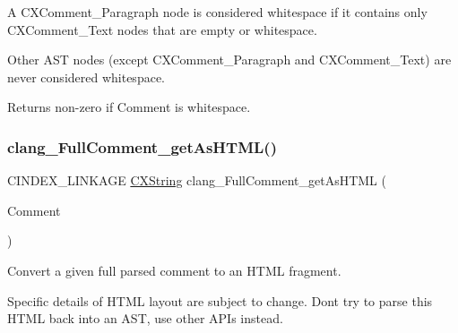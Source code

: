 A {\ttfamily C\+X\+Comment\+\_\+\+Paragraph} node is considered whitespace if it contains only {\ttfamily C\+X\+Comment\+\_\+\+Text} nodes that are empty or whitespace. 

Other A\+ST nodes (except {\ttfamily C\+X\+Comment\+\_\+\+Paragraph} and {\ttfamily C\+X\+Comment\+\_\+\+Text}) are never considered whitespace.

\begin{DoxyReturn}{Returns}
non-\/zero if {\ttfamily Comment} is whitespace. 
\end{DoxyReturn}
\mbox{\label{group__CINDEX__COMMENT_gafdfc03bbfdddd06c380a2644f16ccba9}} 
\subsubsection{\texorpdfstring{clang\+\_\+\+Full\+Comment\+\_\+get\+As\+H\+T\+M\+L()}{clang\_FullComment\_getAsHTML()}}
{\footnotesize\ttfamily C\+I\+N\+D\+E\+X\+\_\+\+L\+I\+N\+K\+A\+GE \mbox{\hyperlink{structCXString}{C\+X\+String}} clang\+\_\+\+Full\+Comment\+\_\+get\+As\+H\+T\+ML (\begin{DoxyParamCaption}\item[{\mbox{\hyperlink{structCXComment}{C\+X\+Comment}}}]{Comment }\end{DoxyParamCaption})}



Convert a given full parsed comment to an H\+T\+ML fragment. 

Specific details of H\+T\+ML layout are subject to change. Don\textquotesingle{}t try to parse this H\+T\+ML back into an A\+ST, use other A\+P\+Is instead.

